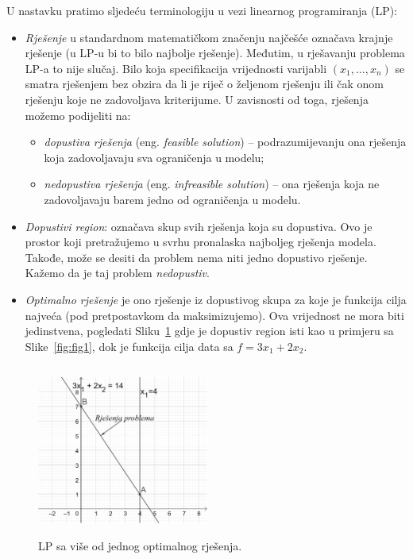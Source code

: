 \documentclass[a4paper, utf8, 11pt, colorlinks]{article}
\begin{document}
 U nastavku pratimo sljedeću terminologiju u vezi linearnog programiranja (LP):
\begin{itemize}
    \item \emph{Rješenje} u standardnom matematičkom značenju najčešće označava krajnje rješenje   (u LP-u bi to bilo najbolje rješenje). Međutim, u rješavanju problema LP-a to  nije slučaj. Bilo koja specifikacija vrijednosti varijabli  $(x_1,\ldots, x_n)$ se smatra rješenjem bez obzira da li je riječ o željenom rješenju ili čak onom rješenju koje ne zadovoljava kriterijume. U zavisnosti od toga, rješenja  možemo podijeliti na:
    \begin{itemize}
        \item \emph{dopustiva rješenja} (eng. \emph{feasible solution}) -- podrazumijevanju ona rješenja koja zadovoljavaju sva ograničenja u modelu;
        \item \emph{nedopustiva rješenja} (eng. \emph{infreasible solution}) -- ona rješenja koja ne zadovoljavaju barem jedno od ograničenja u modelu. 
    \end{itemize}
  \item \emph{Dopustivi region}: označava skup svih rješenja koja su dopustiva. Ovo je prostor koji pretražujemo u svrhu pronalaska najboljeg rješenja modela. Takođe, može se desiti da problem nema niti jedno dopustivo rješenje. Kažemo da je taj problem \emph{nedopustiv}. 
  \item \emph{Optimalno rješenje} je ono rješenje iz dopustivog skupa za koje je funkcija cilja najveća (pod pretpostavkom da maksimizujemo). Ova vrijednost ne mora biti jedinstvena, pogledati Sliku~\ref{fig:multi_solution} gdje je dopustiv region isti kao u primjeru sa Slike~\ref{fig:fig1}, dok je funkcija cilja data sa $f = 3x_1 + 2 x_2$.  
 \end{itemize}
 
 \begin{figure}
     \centering
     \includegraphics[width=160pt, height=160pt]{fig3.eps}
     \caption{LP sa više od jednog optimalnog rješenja.}
     \label{fig:multi_solution}
 \end{figure}
 
\end{document}

